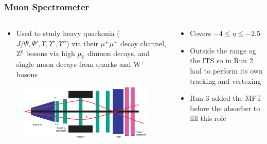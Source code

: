 \documentclass[11pt]{beamer}
\begin{document}
\begin{frame}
    \frametitle{Muon Spectrometer}

    \begin{columns}[c]
        \begin{column}{0.6\textwidth}
            \begin{itemize}
                \item Used to study heavy quarkonia ($J/\Psi,\Psi',\Upsilon,\Upsilon',\Upsilon''$) via their $\mu^+\mu^-$ decay channel, Z$^0$ bosons via high $p_\mathrm{T}$ dimuon decays, and single muon decays from quarks and W$^+$ bosons
            \end{itemize}
            \begin{figure}[h]
                \begin{center}
                    \includegraphics[width=\textwidth]{Figs/MCH_schematic.png}
                \end{center}
            \end{figure}
        \end{column}

        \begin{column}{0.4\textwidth}
            \begin{itemize}
                \item Covers $-4\leq\eta\leq -2.5$
                \item Outside the range og the ITS so in Run 2 had to perform its own tracking and vertexing
                \item Run 3 added the MFT before the absorber to fill this role
            \end{itemize}
        \end{column}
    \end{columns}

\end{frame}
\end{document}
